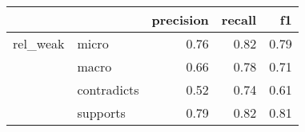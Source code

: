 \begin{tabular}{llrrr}
\toprule
         &          &  precision &  recall &   f1 \\
\midrule
rel\_weak & micro &       0.76 &    0.82 & 0.79 \\
         & macro &       0.66 &    0.78 & 0.71 \\
         & contradicts &       0.52 &    0.74 & 0.61 \\
         & supports &       0.79 &    0.82 & 0.81 \\
\bottomrule
\end{tabular}
